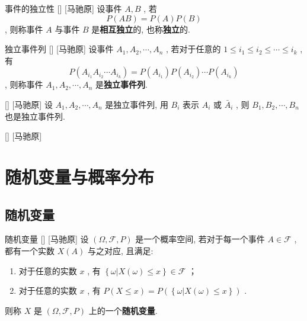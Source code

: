 \documentclass[UTF8]{ctexart}
\begin{document}
        \begin{dfn}
            []
            {事件的独立性}
            []
            [马驰原]
            设事件 \(A,B\) , 若\[P(AB)=P(A)P(B)\], 则称事件 \(A\) 与事件 \(B\) 是\textbf{相互独立}的, 也称\textbf{独立}的. 
        \end{dfn}

        \begin{dfn}
            []
            {独立事件列}
            []
            [马驰原]
            设事件 \(A_1,A_2,\cdots,A_n\) , 若对于任意的 \(1\leq i_1\leq i_2\leq\cdots\leq i_k\) , 有\[P(A_{i_1}A_{i_2}\cdots A_{i_k})=P(A_{i_1})P(A_{i_2})\cdots P(A_{i_k})\], 则称事件 \(A_1,A_2,\cdots,A_n\) 是\textbf{独立事件列}. 
        \end{dfn}

        \begin{ppt}
            []
            {}
            []
            [马驰原]
            设 \(A_1,A_2,\cdots,A_n\) 是独立事件列, 用 \(B_i\) 表示 \(A_i\) 或 \(\bar{A}_i\) , 则 \(B_1,B_2,\cdots,B_n\) 也是独立事件列. 
        \end{ppt}

        \begin{ppt}
            []
            {}
            []
            [马驰原]
        \end{ppt}

\section{随机变量与概率分布}

    \subsection{随机变量}

        \begin{dfn}
            []
            {随机变量}
            []
            [马驰原]
            设 \((\Omega,\mathcal{F},P)\) 是一个概率空间, 若对于每一个事件 \(A\in\mathcal{F}\) , 都有一个实数 \(X(A)\) 与之对应, 且满足: 

            \begin{enumerate}
                \item 对于任意的实数 \(x\) , 有 \(\left\{\omega|X(\omega)\leq x\right\}\in\mathcal{F}\) ；
                \item 对于任意的实数 \(x\) , 有 \(P\left(X\leq x\right)=P\left(\left\{\omega|X(\omega)\leq x\right\}\right)\) . 
            \end{enumerate}

            则称 \(X\) 是 \((\Omega,\mathcal{F},P)\) 上的一个\textbf{随机变量}. 
        \end{dfn}
\end{document}
